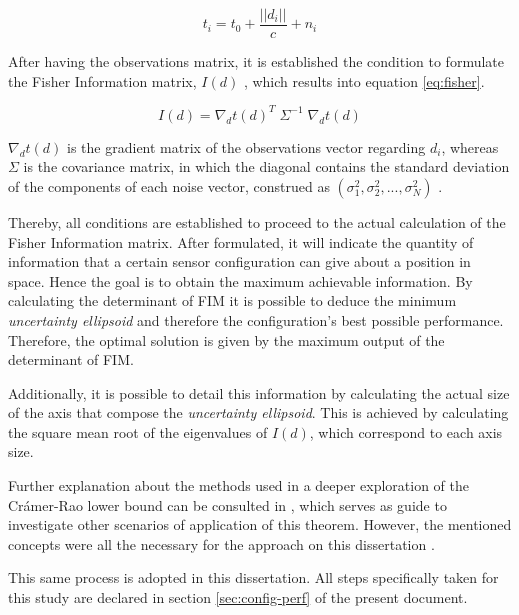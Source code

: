 {\large\[
	t_i = t_0 + \frac{||d_i||}{c} + n_i
	\label{eq:obs_vec}
	\]}

After having the observations matrix, it is established the condition to formulate the Fisher Information matrix, $I(d)$ , which results into equation \ref{eq:fisher}.

{\large\[
	I(d) = \nabla_{d}t(d)^T \; \Sigma^{-1} \; \nabla_{d}t(d)
	\label{eq:fisher}
	\]}

$\nabla_{d}t(d)$ is the gradient matrix of the observations vector regarding $d_i$, whereas $\Sigma$ is the covariance matrix, in which the diagonal contains the standard deviation of the components of each noise vector, construed as $(\sigma_1^2 , \sigma_2^2 , ... , \sigma_N^2)$ .

Thereby, all conditions are established to proceed to the actual calculation of the Fisher Information matrix. After formulated, it will indicate the quantity of information that a certain sensor configuration can give about a position in space. Hence the goal is to obtain the maximum achievable information. By calculating the determinant of FIM it is possible to deduce the minimum \textit{uncertainty ellipsoid} and therefore the configuration's best possible performance. Therefore, the optimal solution is given by the maximum output of the determinant of FIM.

Additionally, it is possible to detail this information by calculating the actual size of the axis that compose the \textit{uncertainty ellipsoid}. This is achieved by calculating the square mean root of the eigenvalues of $I(d)$, which correspond to each axis size.

Further explanation about the methods used in a deeper exploration of the Crámer-Rao lower bound can be consulted in \cite{bishop-cramer-rao}, which serves as guide to investigate other scenarios of application of this theorem. However, the mentioned concepts were all the necessary for the approach on this dissertation .

This same process is adopted in this dissertation. All steps specifically taken for this study are declared in section \ref{sec:config-perf} of the present document.